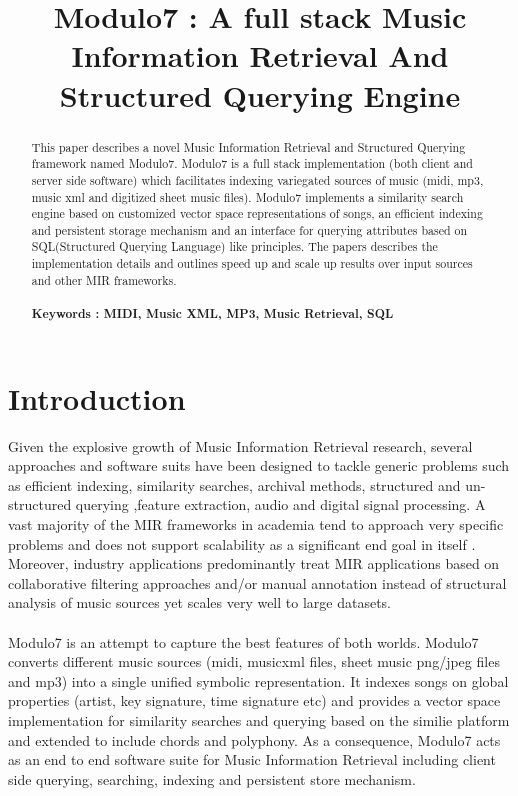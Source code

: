 \documentclass{article}
\title{Modulo7 : A full stack Music Information Retrieval And Structured Querying Engine}
\begin{document}
%
\maketitle
%
\begin{abstract}
This paper describes a novel Music Information Retrieval and Structured Querying framework named Modulo7. Modulo7 is a full stack implementation (both client and server side software) which facilitates indexing variegated sources of music (midi, mp3, music xml and digitized sheet music files). Modulo7 implements a similarity search engine based on customized vector space representations of songs, an efficient indexing and persistent storage mechanism and an interface for querying attributes based on SQL(Structured Querying Language) like principles. The papers describes the implementation details and outlines speed up and scale up results over input sources and other MIR frameworks. \\\\
\textbf{Keywords : MIDI, Music XML, MP3, Music Retrieval, SQL}
\end{abstract}
%
\section{Introduction}\label{sec:introduction}

Given the explosive growth of Music Information Retrieval research, several approaches and software suits have been designed to tackle generic problems such as efficient indexing, similarity searches, archival methods, structured and un-structured querying ,feature extraction, audio and digital signal processing. A vast majority of the MIR frameworks in academia tend to approach very specific problems and does not support scalability as a significant end goal in itself \cite{mirproblems}. Moreover, industry applications predominantly treat MIR applications based on collaborative filtering approaches \cite{amazonreco} and/or manual annotation \cite{musicgenomepandora} instead of structural analysis of music sources yet scales very well to large datasets. \\\\
Modulo7 is an attempt to capture the best features of both worlds. Modulo7 converts different music sources (midi, musicxml files, sheet music png/jpeg files and mp3) into a single unified symbolic representation. It indexes songs on global properties (artist, key signature, time signature etc) and provides a vector space implementation for similarity searches and querying based on the similie \cite{similie} platform and extended to include chords and polyphony. As a consequence, Modulo7 acts as an end to end software suite for Music Information Retrieval including client side querying, searching, indexing and persistent store mechanism.
\end{document}
